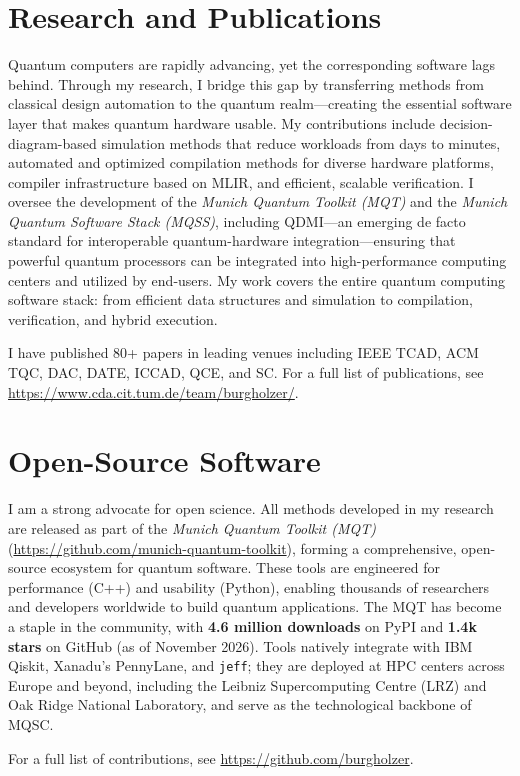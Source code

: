 \documentclass[10pt,a4paper, roman]{moderncv}        %
\begin{document}
\section{Research and Publications}
Quantum computers are rapidly advancing, yet the corresponding software lags behind. Through my research, I bridge this gap by transferring methods from classical design automation to the quantum realm---creating the essential software layer that makes quantum hardware usable.
My contributions include decision-diagram-based simulation methods that reduce workloads from days to minutes, automated and optimized compilation methods for diverse hardware platforms, compiler infrastructure based on MLIR, and efficient, scalable verification.
I oversee the development of the \emph{Munich Quantum Toolkit (MQT)} and the \emph{Munich Quantum Software Stack (MQSS)}, including QDMI---an emerging de facto standard for interoperable quantum-hardware integration---ensuring that powerful quantum processors can be integrated into high-performance computing centers and utilized by end-users.
My work covers the entire quantum computing software stack: from efficient data structures and simulation to compilation, verification, and hybrid execution.

I have published 80+ papers in leading venues including IEEE TCAD, ACM TQC, DAC, DATE, ICCAD, QCE, and SC. For a full list of publications, see \url{https://www.cda.cit.tum.de/team/burgholzer/}.

\section{Open-Source Software}
I am a strong advocate for open science. All methods developed in my research are released as part of the \emph{Munich Quantum Toolkit (MQT)} (\url{https://github.com/munich-quantum-toolkit}), forming a comprehensive, open-source ecosystem for quantum software.
These tools are engineered for performance (C++) and usability (Python), enabling thousands of researchers and developers worldwide to build quantum applications.
The MQT has become a staple in the community, with \textbf{4.6 million downloads} on PyPI and \textbf{1.4k stars} on GitHub (as of November 2026).
Tools natively integrate with IBM Qiskit, Xanadu's PennyLane, and \texttt{jeff}; they are deployed at HPC centers across Europe and beyond, including the Leibniz Supercomputing Centre (LRZ) and Oak Ridge National Laboratory, and serve as the technological backbone of MQSC.

For a full list of contributions, see \url{https://github.com/burgholzer}.
\end{document}
